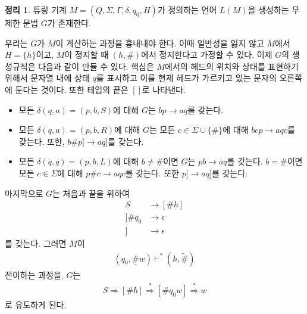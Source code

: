 \documentclass[b5paper]{book}
\theoremstyle{definition}
\newtheorem{thm}{정리}[chapter]
\newenvironment{pf*}{\pushQED{\qed}\pf}{\popQED\endpf}
\begin{document}
\begin{thm}
    튜링 기계 $M = (Q, \Sigma, \Gamma, \delta, q_0, H)$가 정의하는 언어
    $L(M)$을 생성하는 무제한 문법 $G$가 존재한다.
\end{thm}
\begin{pf*}
    우리는 $G$가 $M$이 계산하는 과정을 흉내내야 한다. 이때 일반성을 잃지 않고
    $M$에서 $H = \{h\}$이고, $M$이 정지할 때 $(h, \#)$에서 정지한다고
    가정할 수 있다. 
    이제 $G$의 생성규칙은 다음과 같이 만들 수 있다. 핵심은 $M$에서의 헤드의 위치와
    상태를 표현하기 위해서 문자열 내에 상태 $q$를 표시하고 이를 현제 헤드가 가르키고
    있는 문자의 오른쪽에 둔다는 것이다. 또한 테입의 끝은 $[]$로 나타낸다.
    \begin{itemize}
        \item 모든 $\delta(q, a) = (p, b, S)$에 대해 $G$는 $bp \rightarrow
        aq$를 갖는다.
        \item 모든 $\delta(q, a) = (p, b, R)$에 대해 $G$는 모든 $c \in \Sigma 
        \cup \{\#\}$에 대해 $bcp \rightarrow aqc$를 갖는다. 또한, $b\# p] \rightarrow
        aq]$를 갖는다.
        \item 모든 $\delta(q, q) = (p, b, L)$에 대해 $b \neq \#$이면 
        $G$는 $pb \rightarrow aq$를 갖는다. $b = \#$이면 모든 $c \in \Sigma$에 대해
        $p\# c \rightarrow aqc$를 갖는다. 또한 $p] \rightarrow aq]$를 갖는다. 
    \end{itemize}
    마지막으로 $G$는 처음과 끝을 위하여
    \begin{align*}
        S &\rightarrow [\# h] \\ 
        [\#q_0 &\rightarrow \epsilon \\ 
        ] &\rightarrow \epsilon
    \end{align*}
    를 갖는다. 그러면 $M$이 
    \begin{align*}
        (q_0, \underline{\#}w) \vdash^* (h, \underleftarrow{\#})
    \end{align*}
    전이하는 과정을, $G$는 
    \begin{align*}
        S \Rightarrow [\# h] \overset{*}{\Rightarrow} [\#q_0 w] 
        \overset{*}{\Rightarrow} w
    \end{align*}
    로 유도하게 된다. 
\end{pf*}
\end{document}
